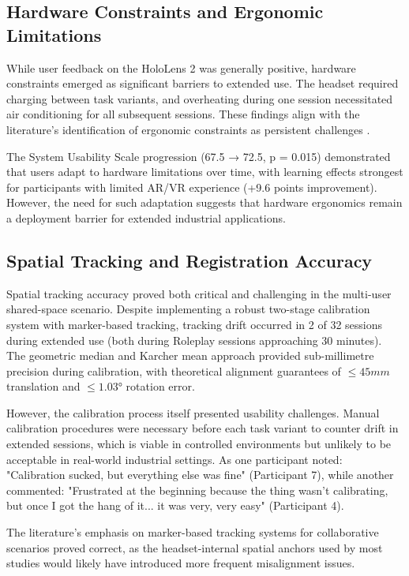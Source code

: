 \subsection{Hardware Constraints and Ergonomic Limitations}
While user feedback on the HoloLens 2 was generally positive, hardware constraints emerged as significant barriers to extended use. The headset required charging between task variants, and overheating during one session necessitated air conditioning for all subsequent sessions. These findings align with the literature's identification of ergonomic constraints as persistent challenges \cite{cogurcu2023comparative, yang2023usability}.

The System Usability Scale progression (67.5 → 72.5, p = 0.015) demonstrated that users adapt to hardware limitations over time, with learning effects strongest for participants with limited AR/VR experience (+9.6 points improvement). However, the need for such adaptation suggests that hardware ergonomics remain a deployment barrier for extended industrial applications.

\subsection{Spatial Tracking and Registration Accuracy}
Spatial tracking accuracy proved both critical and challenging in the multi-user shared-space scenario. Despite implementing a robust two-stage calibration system with marker-based tracking, tracking drift occurred in 2 of 32 sessions during extended use (both during Roleplay sessions approaching 30 minutes). The geometric median and Karcher mean approach provided sub-millimetre precision during calibration, with theoretical alignment guarantees of $\leq45 mm$ translation and $\leq1.03°$ rotation error.

However, the calibration process itself presented usability challenges. Manual calibration procedures were necessary before each task variant to counter drift in extended sessions, which is viable in controlled environments but unlikely to be acceptable in real-world industrial settings. As one participant noted: "Calibration sucked, but everything else was fine" (Participant 7), while another commented: "Frustrated at the beginning because the thing wasn't calibrating, but once I got the hang of it... it was very, very easy" (Participant 4).

The literature's emphasis on marker-based tracking systems for collaborative scenarios \cite{martins2024multiUser} proved correct, as the headset-internal spatial anchors used by most studies would likely have introduced more frequent misalignment issues.

